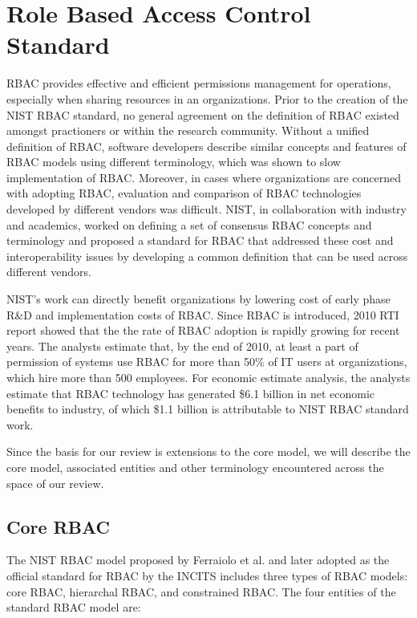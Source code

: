 \section{Role Based Access Control Standard} \label{sec:core-rbac}

RBAC provides effective and efficient permissions management for operations, especially when sharing resources in an organizations.
Prior to the creation of the NIST RBAC standard, no general agreement on the definition 
of RBAC existed amongst practioners or within the research community. 
Without a unified definition of RBAC, software developers describe similar concepts and features of RBAC models using different terminology, which was shown to slow implementation of RBAC.  
Moreover, in cases where organizations are concerned with adopting RBAC,
evaluation and comparison of RBAC technologies developed by different vendors was difficult.
NIST, in collaboration with industry and academics, worked on defining a set of consensus RBAC concepts and terminology and proposed a standard for RBAC that addressed these cost and interoperability issues by developing a common definition that can be used across different vendors.

NIST's work can directly benefit organizations by lowering cost of early phase R\&D and implementation costs of RBAC.
Since RBAC is introduced, 2010 RTI report showed that the the rate of RBAC adoption is rapidly growing for recent years. 
The analysts estimate that, by the end of 2010, at least a part of permission of systems use RBAC for more than 50\% of IT users at organizations, which
hire more than 500 employees. For economic estimate analysis, the analysts estimate that RBAC technology has generated \$6.1 billion in net economic benefits to industry, of which \$1.1 billion is attributable to NIST RBAC standard work.

Since the basis for our review is extensions to the core model, we will describe the core model, associated entities and other terminology encountered across the space of our review.

\subsection{Core RBAC} 

The NIST RBAC model proposed by Ferraiolo et al. \cite{ferraiolo} and later adopted as the official standard for RBAC by the INCITS includes three types of RBAC models: core RBAC, hierarchal RBAC, and constrained RBAC. The four entities of the standard RBAC model are:

